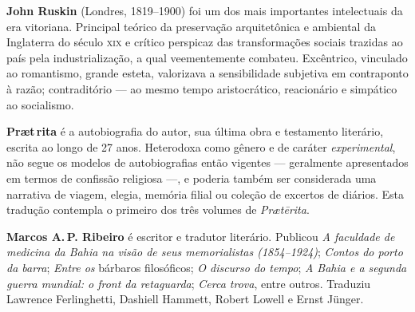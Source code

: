 \textbf{John Ruskin} (Londres, 1819--1900) foi um dos mais importantes intelectuais da era vitoriana. Principal teórico da preservação arquitetônica e ambiental da Inglaterra do século \textsc{xix} e crítico perspicaz das transformações sociais trazidas ao país pela industrialização, a qual veementemente combateu. Excêntrico, vinculado ao romantismo, grande esteta, valorizava a sensibilidade subjetiva em contraponto à razão; contraditório --- ao mesmo tempo aristocrático, reacionário e simpático ao socialismo.

\textbf{Pr\ae t\,rita} é a autobiografia do autor, sua última obra e testamento literário, escrita ao longo de 27 anos. Heterodoxa como gênero e de caráter \textit{experimental}, não segue os modelos de autobiografias então vigentes --- geralmente apresentados em termos de confissão religiosa ---, e poderia também ser considerada uma narrativa de viagem, elegia, memória filial ou coleção de excertos de diários. Esta tradução contempla o primeiro dos três volumes de \textit{Pr\ae tērita}.

\textbf{Marcos A.\,P. Ribeiro} é escritor e tradutor literário. Publicou \textit{A faculdade de medicina da Bahia na visão de seus memorialistas (1854--1924)}; \textit{Contos do porto da barra}; \textit{Entre os} bárbaros filosóficos; \textit{O discurso do tempo}; \textit{A Bahia e a segunda guerra mundial: o front da retaguarda}; \textit{Cerca trova}, entre outros. Traduziu Lawrence Ferlinghetti, Dashiell Hammett, Robert Lowell e Ernst Jünger.







